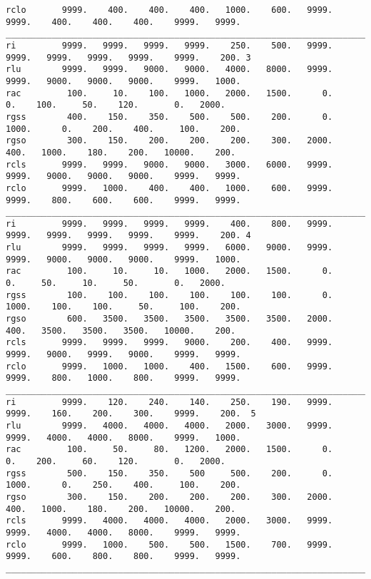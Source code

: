 \documentclass{egu}                  %
\begin{document}
\begin{scriptsize}
\begin{verbatim}
rclo       9999.    400.    400.    400.   1000.    600.   9999.   9999.    400.    400.    400.    9999.   9999.
_________________________________________________________________________________________________________________
ri         9999.   9999.   9999.   9999.    250.    500.   9999.   9999.   9999.   9999.   9999.    9999.    200. 3
rlu        9999.   9999.   9000.   9000.   4000.   8000.   9999.   9999.   9000.   9000.   9000.    9999.   1000.
rac         100.     10.    100.   1000.   2000.   1500.      0.      0.    100.     50.    120.       0.   2000.
rgss        400.    150.    350.    500.    500.    200.      0.   1000.      0.    200.    400.     100.    200.
rgso        300.    150.    200.    200.    200.    300.   2000.    400.   1000.    180.    200.   10000.    200.
rcls       9999.   9999.   9000.   9000.   3000.   6000.   9999.   9999.   9000.   9000.   9000.    9999.   9999.
rclo       9999.   1000.    400.    400.   1000.    600.   9999.   9999.    800.    600.    600.    9999.   9999.
_________________________________________________________________________________________________________________
ri         9999.   9999.   9999.   9999.    400.    800.   9999.   9999.   9999.   9999.   9999.    9999.    200. 4
rlu        9999.   9999.   9999.   9999.   6000.   9000.   9999.   9999.   9000.   9000.   9000.    9999.   1000.
rac         100.     10.     10.   1000.   2000.   1500.      0.      0.     50.     10.     50.       0.   2000.
rgss        100.    100.    100.    100.    100.    100.      0.   1000.    100.    100.     50.     100.    200.
rgso        600.   3500.   3500.   3500.   3500.   3500.   2000.    400.   3500.   3500.   3500.   10000.    200. 
rcls       9999.   9999.   9999.   9000.    200.    400.   9999.   9999.   9000.   9999.   9000.    9999.   9999.
rclo       9999.   1000.   1000.    400.   1500.    600.   9999.   9999.    800.   1000.    800.    9999.   9999.
_________________________________________________________________________________________________________________
ri         9999.    120.    240.    140.    250.    190.   9999.   9999.    160.    200.    300.    9999.    200.  5
rlu        9999.   4000.   4000.   4000.   2000.   3000.   9999.   9999.   4000.   4000.   8000.    9999.   1000.
rac         100.     50.     80.   1200.   2000.   1500.      0.      0.    200.     60.    120.       0.   2000.
rgss        500.    150.    350.    500     500.    200.      0.   1000.      0.    250.    400.     100.    200.
rgso        300.    150.    200.    200.    200.    300.   2000.    400.   1000.    180.    200.   10000.    200.
rcls       9999.   4000.   4000.   4000.   2000.   3000.   9999.   9999.   4000.   4000.   8000.    9999.   9999.
rclo       9999.   1000.    500.    500.   1500.    700.   9999.   9999.    600.    800.    800.    9999.   9999.
_________________________________________________________________________________________________________________
\end{verbatim}\end{scriptsize}
\end{document}
